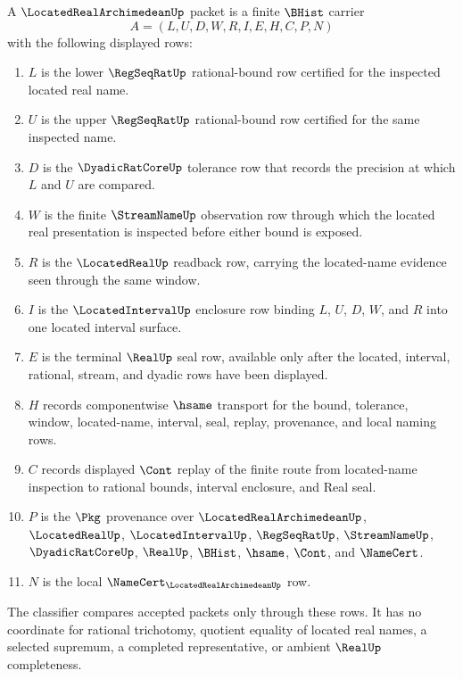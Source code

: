 \begin{definition}
\label{def:located-real-archimedean-packet}
A $\LocatedRealArchimedeanUp$ packet is a finite $\BHist$ carrier
$$
A=(L,U,D,W,R,I,E,H,C,P,N)
$$
with the following displayed rows:
\begin{enumerate}
\item $L$ is the lower $\RegSeqRatUp$ rational-bound row certified for the inspected located real name.
\item $U$ is the upper $\RegSeqRatUp$ rational-bound row certified for the same inspected name.
\item $D$ is the $\DyadicRatCoreUp$ tolerance row that records the precision at which $L$ and $U$ are compared.
\item $W$ is the finite $\StreamNameUp$ observation row through which the located real presentation is inspected before either bound is exposed.
\item $R$ is the $\LocatedRealUp$ readback row, carrying the located-name evidence seen through the same window.
\item $I$ is the $\LocatedIntervalUp$ enclosure row binding $L$, $U$, $D$, $W$, and $R$ into one located interval surface.
\item $E$ is the terminal $\RealUp$ seal row, available only after the located, interval, rational, stream, and dyadic rows have been displayed.
\item $H$ records componentwise $\hsame$ transport for the bound, tolerance, window, located-name, interval, seal, replay, provenance, and local naming rows.
\item $C$ records displayed $\Cont$ replay of the finite route from located-name inspection to rational bounds, interval enclosure, and Real seal.
\item $P$ is the $\Pkg$ provenance over $\LocatedRealArchimedeanUp$, $\LocatedRealUp$, $\LocatedIntervalUp$, $\RegSeqRatUp$, $\StreamNameUp$, $\DyadicRatCoreUp$, $\RealUp$, $\BHist$, $\hsame$, $\Cont$, and $\NameCert$.
\item $N$ is the local $\NameCert_{\LocatedRealArchimedeanUp}$ row.
\end{enumerate}
The classifier compares accepted packets only through these rows. It has no coordinate for rational trichotomy, quotient equality of located real names, a selected supremum, a completed representative, or ambient $\RealUp$ completeness.
\end{definition}

